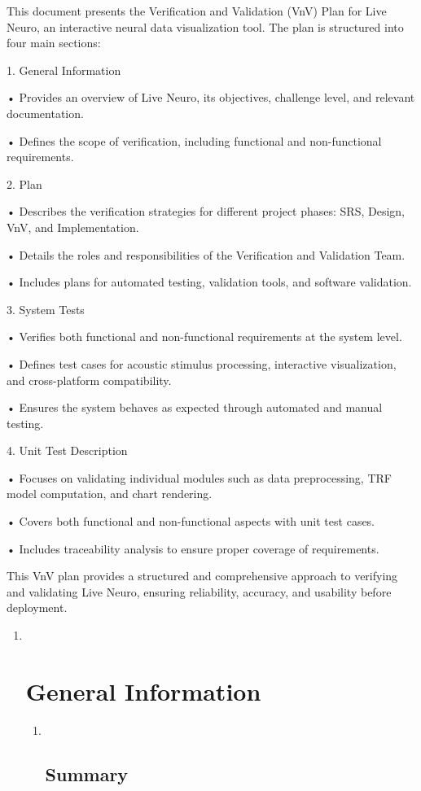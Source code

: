 \documentclass[
]{article}
\begin{document}
This document presents the Verification and Validation (VnV) Plan for
Live Neuro, an interactive neural data visualization tool. The plan is
structured into four main sections:

1. General Information

• Provides an overview of Live Neuro, its objectives, challenge level,
and relevant documentation.

• Defines the scope of verification, including functional and
non-functional requirements.

2. Plan

• Describes the verification strategies for different project phases:
SRS, Design, VnV, and Implementation.

• Details the roles and responsibilities of the Verification and
Validation Team.

• Includes plans for automated testing, validation tools, and software
validation.

3. System Tests

• Verifies both functional and non-functional requirements at the system
level.

• Defines test cases for acoustic stimulus processing, interactive
visualization, and cross-platform compatibility.

• Ensures the system behaves as expected through automated and manual
testing.

4. Unit Test Description

• Focuses on validating individual modules such as data preprocessing,
TRF model computation, and chart rendering.

• Covers both functional and non-functional aspects with unit test
cases.

• Includes traceability analysis to ensure proper coverage of
requirements.

This VnV plan provides a structured and comprehensive approach to
verifying and validating Live Neuro, ensuring reliability, accuracy, and
usability before deployment.

\begin{enumerate}
\def\labelenumi{\arabic{enumi}.}
\setcounter{enumi}{1}
\item ~
  \hypertarget{general-information}{%
  \section{General Information}\label{general-information}}

  \begin{enumerate}
  \def\labelenumii{\arabic{enumii}.}
  \item ~
    \hypertarget{summary}{%
    \subsection{Summary}\label{summary}}
  \end{enumerate}
\end{enumerate}
\end{document}
